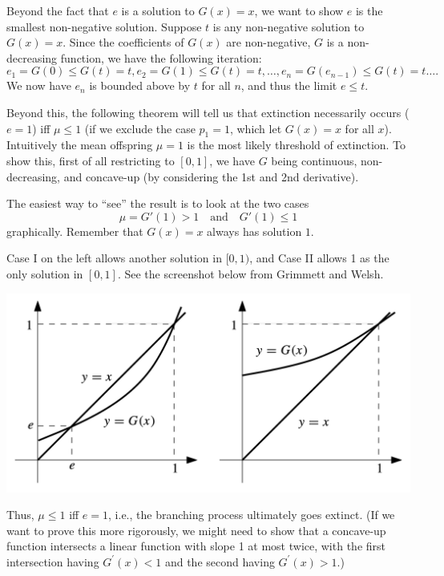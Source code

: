 \documentclass[11pt]{article}
\begin{document}
Beyond the fact that $e$ is a solution to $G(x)=x$, we want to show $e$ is the smallest non-negative solution. Suppose $t$ is any non-negative solution to $G(x)=x$. Since the coefficients of $G(x)$ are non-negative, $G$ is a non-decreasing function, we have the following iteration:
\[
e_{1}=G(0)\leq G(t)=t,
e_{2}=G(1)\leq G(t)=t,
\dots ,
e_{n}=G(e_{n- 1})\leq G(t)=t\dots .
\]
We now have $e_{n}$ is bounded above by $t$ for all $n$, and thus the limit $e\leq t$.

Beyond this, the following theorem will tell us that extinction necessarily occurs ($e=1$) iff $\mu \leq 1$ (if we exclude the case $p_{1}=1$, which let $G(x)=x$ for all $x$). Intuitively the mean offspring $\mu =1$ is the most likely threshold of extinction. To show this, first of all restricting to $[0,1]$, we have $G$ being continuous, non-decreasing, and concave-up (by considering the 1st and 2nd derivative).

The easiest way to “see” the result is to look at the two cases
\[
\mu =G'(1)>1 \quad \text{and} \quad G'(1)\leq 1
\]
graphically. Remember that $G(x)=x$ always has solution $1$.

Case I on the left allows another solution in $[0,1)$, and Case II allows 1 as the only solution in $[0,1]$. See the screenshot below from Grimmett and Welsh. 

\includegraphics[scale = 0.38]{extinction}

Thus, $\mu \leq 1$ iff $e=1$, i.e., the branching process ultimately goes extinct. (If we want to prove this more rigorously, we might need to show that a concave-up function intersects a linear function with slope 1 at most twice, with the first intersection having $G^{' }(x)<1$ and the second having $G^{' }(x)>1$.)



\end{document}

